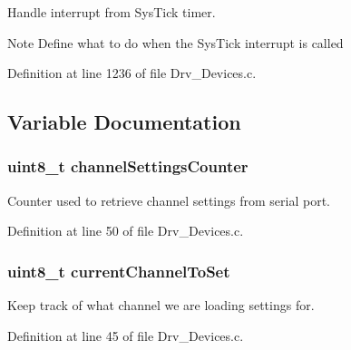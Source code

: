 Handle interrupt from Sys\+Tick timer. 

\begin{DoxyNote}{Note}
Define what to do when the Sys\+Tick interrupt is called 
\end{DoxyNote}


Definition at line 1236 of file Drv\+\_\+\+Devices.\+c.



\subsection{Variable Documentation}
\subsubsection[{\texorpdfstring{channel\+Settings\+Counter}{channelSettingsCounter}}]{\setlength{\rightskip}{0pt plus 5cm}uint8\+\_\+t channel\+Settings\+Counter}\hypertarget{group__Devices__Library_gac064adc9b9dc0e68d43cf71bd52a0fdb}{}\label{group__Devices__Library_gac064adc9b9dc0e68d43cf71bd52a0fdb}


Counter used to retrieve channel settings from serial port. 



Definition at line 50 of file Drv\+\_\+\+Devices.\+c.

\subsubsection[{\texorpdfstring{current\+Channel\+To\+Set}{currentChannelToSet}}]{\setlength{\rightskip}{0pt plus 5cm}uint8\+\_\+t current\+Channel\+To\+Set}\hypertarget{group__Devices__Library_ga15bd8e07189205b21eb37b666895ee0e}{}\label{group__Devices__Library_ga15bd8e07189205b21eb37b666895ee0e}


Keep track of what channel we are loading settings for. 



Definition at line 45 of file Drv\+\_\+\+Devices.\+c.


